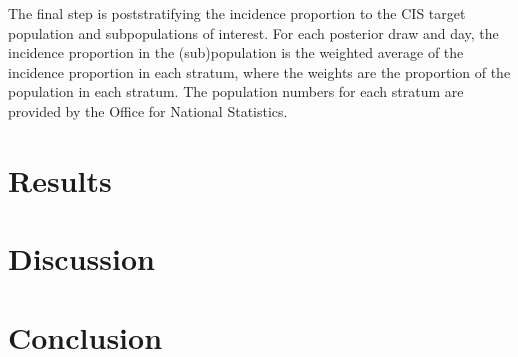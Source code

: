 \documentclass[thesis.tex]{subfiles}
\begin{document}
The final step is poststratifying the incidence proportion to the CIS target population and subpopulations of interest.
For each posterior draw and day, the incidence proportion in the (sub)population is the weighted average of the incidence proportion in each stratum, where the weights are the proportion of the population in each stratum.
The population numbers for each stratum are provided by the Office for National Statistics.

\section{Results} \label{backcalc:sec:results}

\section{Discussion} \label{backcalc:sec:discussion}

\section{Conclusion} \label{backcalc:sec:conclustion}


\ifSubfilesClassLoaded{
  \listoftodos
}{}
\end{document}
